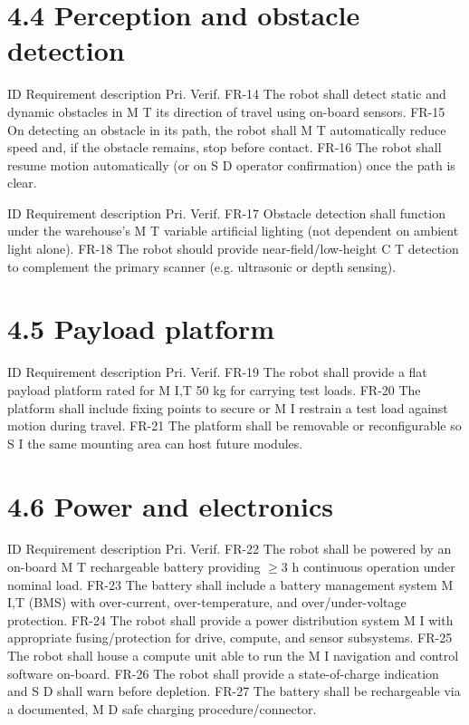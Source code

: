 \section*{4.4 Perception and obstacle detection}

ID          Requirement description                                    Pri.         Verif. FR-14       The robot shall detect static and dynamic obstacles in     M              T its direction of travel using on-board sensors. FR-15       On detecting an obstacle in its path, the robot shall      M              T automatically reduce speed and, if the obstacle remains, stop before contact. FR-16       The robot shall resume motion automatically (or on          S             D operator confirmation) once the path is clear.

ID          Requirement description                                     Pri.         Verif. FR-17       Obstacle detection shall function under the warehouse's     M              T variable artificial lighting (not dependent on ambient light alone). FR-18       The robot should provide near-field/low-height               C             T detection to complement the primary scanner (e.g. ultrasonic or depth sensing).

\section*{4.5 Payload platform}

ID          Requirement description                                     Pri.         Verif. FR-19       The robot shall provide a flat payload platform rated for   M             I,T 50 kg for carrying test loads. FR-20       The platform shall include fixing points to secure or       M               I restrain a test load against motion during travel. FR-21       The platform shall be removable or reconfigurable so         S              I the same mounting area can host future modules.

\section*{4.6 Power and electronics}

ID          Requirement description                                     Pri.         Verif. FR-22       The robot shall be powered by an on-board                   M              T rechargeable battery providing $\geq$3 h continuous operation under nominal load. FR-23       The battery shall include a battery management system       M             I,T (BMS) with over-current, over-temperature, and over/under-voltage protection. FR-24       The robot shall provide a power distribution system         M               I with appropriate fusing/protection for drive, compute, and sensor subsystems. FR-25       The robot shall house a compute unit able to run the        M               I navigation and control software on-board. FR-26       The robot shall provide a state-of-charge indication and     S             D shall warn before depletion. FR-27       The battery shall be rechargeable via a documented,         M              D safe charging procedure/connector.


